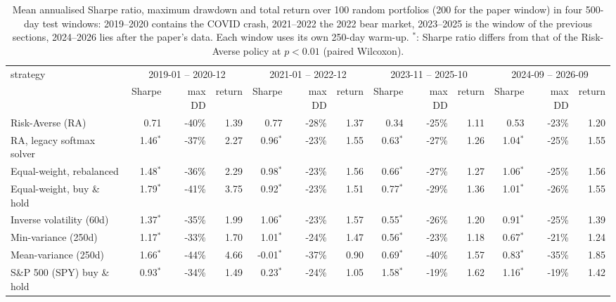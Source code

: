 \begin{table}[ht!]
\centering
\footnotesize
\setlength{\tabcolsep}{4pt}
\begin{tabular}{lrrrrrrrrrrrr}
\hline
strategy & \multicolumn{3}{c}{2019-01 -- 2020-12} & \multicolumn{3}{c}{2021-01 -- 2022-12} & \multicolumn{3}{c}{2023-11 -- 2025-10} & \multicolumn{3}{c}{2024-09 -- 2026-09} \\
 & Sharpe & max DD & return & Sharpe & max DD & return & Sharpe & max DD & return & Sharpe & max DD & return \\
\hline
Risk-Averse (RA) & 0.71 & -40\% & 1.39 & 0.77 & -28\% & 1.37 & 0.34 & -25\% & 1.11 & 0.53 & -23\% & 1.20 \\
RA, legacy softmax solver & 1.46$^{*}$ & -37\% & 2.27 & 0.96$^{*}$ & -23\% & 1.55 & 0.63$^{*}$ & -27\% & 1.26 & 1.04$^{*}$ & -25\% & 1.55 \\
Equal-weight, rebalanced & 1.48$^{*}$ & -36\% & 2.29 & 0.98$^{*}$ & -23\% & 1.56 & 0.66$^{*}$ & -27\% & 1.27 & 1.06$^{*}$ & -25\% & 1.56 \\
Equal-weight, buy \& hold & 1.79$^{*}$ & -41\% & 3.75 & 0.92$^{*}$ & -23\% & 1.51 & 0.77$^{*}$ & -29\% & 1.36 & 1.01$^{*}$ & -26\% & 1.55 \\
Inverse volatility (60d) & 1.37$^{*}$ & -35\% & 1.99 & 1.06$^{*}$ & -23\% & 1.57 & 0.55$^{*}$ & -26\% & 1.20 & 0.91$^{*}$ & -25\% & 1.39 \\
Min-variance (250d) & 1.17$^{*}$ & -33\% & 1.70 & 1.01$^{*}$ & -24\% & 1.47 & 0.56$^{*}$ & -23\% & 1.18 & 0.67$^{*}$ & -21\% & 1.24 \\
Mean-variance (250d) & 1.66$^{*}$ & -44\% & 4.66 & -0.01$^{*}$ & -37\% & 0.90 & 0.69$^{*}$ & -40\% & 1.57 & 0.83$^{*}$ & -35\% & 1.85 \\
S\&P 500 (SPY) buy \& hold & 0.93$^{*}$ & -34\% & 1.49 & 0.23$^{*}$ & -24\% & 1.05 & 1.58$^{*}$ & -19\% & 1.62 & 1.16$^{*}$ & -19\% & 1.42 \\
\hline
\end{tabular}
\caption{Mean annualised Sharpe ratio, maximum drawdown and total return over 100 random portfolios (200 for the paper window) in four 500-day test windows: 2019--2020 contains the COVID crash, 2021--2022 the 2022 bear market, 2023--2025 is the window of the previous sections, 2024--2026 lies after the paper's data. Each window uses its own 250-day warm-up. $^{*}$: Sharpe ratio differs from that of the Risk-Averse policy at $p<0.01$ (paired Wilcoxon).}
\label{tab:regimes}
\end{table}
